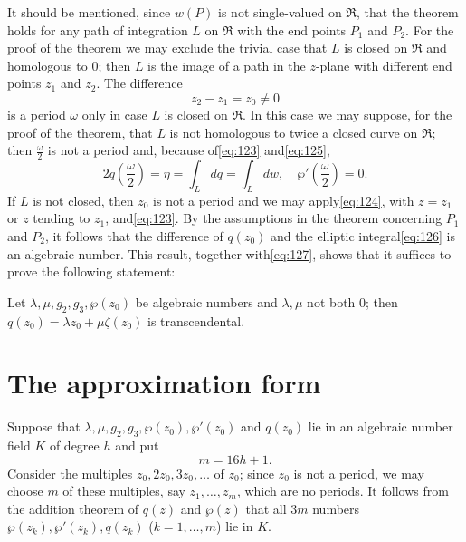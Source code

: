 It should be mentioned, since $w(P)$ is not single-valued on $\mathfrak{R}$, that the theorem holds for any path of integration $L$ on $\mathfrak{R}$ with the end points $P_1$ and $P_2$. For the proof of the theorem we may exclude the trivial case that $L$ is closed on $\mathfrak{R}$ and homologous to $0$; then $L$ is the image of a path in the $z$-plane with different end points $z_1$ and $z_2$. The difference
\[
z_2 - z_1 = z_0 \neq 0
\]
is a period $\omega$ only in case $L$ is closed on $\mathfrak{R}$. In this case we may suppose, for the proof of the theorem, that $L$ is not homologous to twice a closed curve on $\mathfrak{R}$; then $\frac{\omega}{2}$ is not a period and, because of\eqref{eq:123} and\eqref{eq:125},
\begin{equation}
2q\left(\frac{\omega}{2}\right) = \eta = \int_{L} dq = \int_{L} dw, \quad \wp'\left(\frac{\omega}{2}\right) = 0. \tag{127}\label{eq:127}
\end{equation}
If $L$ is not closed, then $z_0$ is not a period and we may apply\eqref{eq:124}, with $z = z_1$ or $z$ tending to $z_1$, and\eqref{eq:123}. By the assumptions in the theorem concerning $P_1$ and $P_2$, it follows that the difference of $q(z_0)$ and the elliptic integral\eqref{eq:126} is an algebraic number. This result, together with\eqref{eq:127}, shows that it suffices to prove the following statement:

Let $\lambda, \mu, g_2, g_3, \wp(z_0)$ be algebraic numbers and $\lambda, \mu$ not both $0$; then $q(z_0) = \lambda z_0 + \mu \zeta(z_0)$ is transcendental.

\section{The approximation form}\label{sec:4.3}

Suppose that $\lambda, \mu, g_2, g_3, \wp(z_0), \wp'(z_0)$ and $q(z_0)$ lie in an algebraic number field $K$ of degree $h$ and put
\[
m = 16h + 1.
\]
Consider the multiples $z_0, 2z_0, 3z_0, \dots$ of $z_0$; since $z_0$ is not a period, we may choose $m$ of these multiples, say $z_1, \dots, z_m$, which are no periods. It follows from the addition theorem of $q(z)$ and $\wp(z)$ that all $3m$ numbers $\wp(z_k), \wp'(z_k), q(z_k)$ ($k = 1, \dots, m$) lie in $K$.


